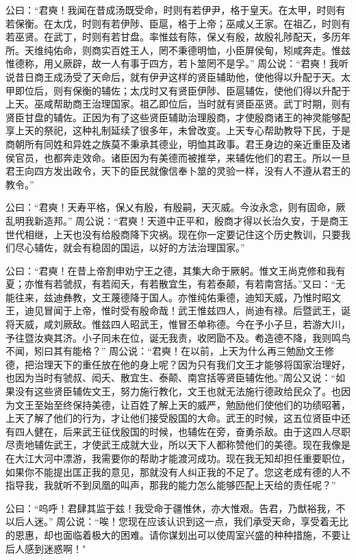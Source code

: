 \documentclass[a4paper,12pt,UTF8,twoside]{ctexbook}
\begin{document}
公曰：“君奭！我闻在昔成汤既受命，时则有若伊尹，格于皇天。在太甲，时则有若保衡。在太戊，时则有若伊陟、臣扈，格于上帝；巫咸乂王家。在祖乙，时则有若巫贤。在武丁，时则有若甘盘。率惟兹有陈，保乂有殷，故殷礼陟配天，多历年所。天维纯佑命，则商实百姓王人，罔不秉德明恤，小臣屏侯甸，矧咸奔走。惟兹惟德称，用乂厥辟，故一人有事于四方，若卜筮罔不是孚。”
周公说：“君奭！我听说昔日商王成汤受了天命后，就有伊尹这样的贤臣辅助他，使他得以升配于天。太甲即位后，则有保衡的辅佐；太戊时又有贤臣伊陟、臣扈辅佐，使他们得以升配于上天。巫咸帮助商王治理国家。祖乙即位后，当时就有贤臣巫贤。武丁时期，则有贤臣甘盘的辅佐。正因为有了这些贤臣辅助治理殷商，才使殷商诸王的神灵能够配享上天的祭祀，这种礼制延续了很多年，未曾改变。上天专心帮助教导下民，于是商朝所有同姓和异姓之族莫不秉承其德业，明恤其政事。君王身边的亲近重臣及诸侯官员，也都奔走效命。诸臣因为有美德而被推举，来辅佐他们的君王。所以一旦君王向四方发出政令，天下的臣民就像信奉卜筮的灵验一样，没有人不遵从君王的教令。”

公曰：“君奭！天寿平格，保乂有殷，有殷嗣，天灭威。今汝永念，则有固命，厥乱明我新造邦。”
周公说：“君奭！天道中正平和，殷商才得以长治久安，于是商王世代相继，上天也没有给殷商降下灾祸。现在你一定要记住这个历史教训，只要我们尽心辅佐，就会有稳固的国运，以好的方法治理国家。”

公曰：“君奭！在昔上帝割申劝宁王之德，其集大命于厥躬。惟文王尚克修和我有夏；亦惟有若虢叔，有若闳夭，有若散宜生，有若泰颠，有若南宫括。”又曰：“无能往来，兹迪彝教，文王蔑德降于国人。亦惟纯佑秉德，迪知天威，乃惟时昭文王，迪见冒闻于上帝，惟时受有殷命哉！武王惟兹四人，尚迪有禄。后暨武王，诞将天威，咸刘厥敌。惟兹四人昭武王，惟冒丕单称德。今在予小子旦，若游大川，予往暨汝奭其济。小子同未在位，诞无我责，收罔勖不及。耇造德不降，我则鸣鸟不闻，矧曰其有能格？”
周公说：“君奭！在以前，上天为什么再三勉励文王修德，把治理天下的重任放在他的身上呢？因为只有我们文王才能够将国家治理好，也因为当时有虢叔、闳夭、散宜生、泰颠、南宫括等贤臣辅佐他。”周公又说：“如果没有这些贤臣辅佐文王，努力施行教化，文王也就无法施行德政给民众了。也因为文王至始至终保持美德，让百姓了解上天的威严，勉励他们使他们的功绩昭著，上天了解了他们的行为，才让他们接受殷国的大命。武王的时候，这五位贤臣中还有四人健在，后来武王征伐殷国的时候，也辅佐在旁，奋勇杀敌。由于这四人尽职尽责地辅佐武王，才使武王成就大业，所以天下人都称赞他们的美德。现在我像是在大江大河中漂游，我需要你的帮助才能渡河成功。现在我无知却担任重要职位，如果你不能提出匡正我的意见，那就没有人纠正我的不足了。您这老成有德的人不指导我，我就听不到凤凰的叫声，那我的能力怎么能够匹配上天给的责任呢？”

公曰：“呜呼！君肆其监于兹！我受命于疆惟休，亦大惟艰。告君，乃猷裕我，不以后人迷。”
周公说：“唉！您现在应该认识到这一点，我们承受天命，享受着无比的恩惠，却也面临着极大的困难。请你谋划出可以使周室兴盛的种种措施，不要让后人感到迷惑啊！"
\end{document}
